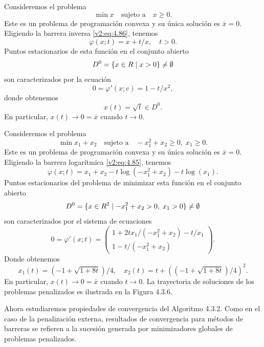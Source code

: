\begin{example}\label{v2:exa:4.3.4}
    Consideremos el problema
    \[
        \min x \quad \text{sujeto a} \quad x \ge 0.
    \]
    Este es un problema de programación convexa y su única solución es $\bar{x} = 0$.
    Eligiendo la barrera inversa \eqref{v2:eq:4.86}, tenemos
    \[
        \varphi(x; t) = x + t/x, \quad t > 0.
    \]
    Puntos estacionarios de esta función en el conjunto abierto
    \[
        D^0 = \{x \in R \mid x > 0\} \neq \emptyset
    \]
    son caracterizados por la ecuación
    \[
        0 = \varphi'(x; c) = 1 - t/x^2,
    \]
    donde obtenemos
    \[
        x(t) = \sqrt{t} \in D^0.
    \]
    En particular, $x(t) \to 0 = \bar{x}$ cuando $t \to 0$.

\end{example}

\begin{example}\label{v2:exa:4.3.5}
    Consideremos el problema
    \[
        \min x_1 + x_2 \quad \text{sujeto a} \quad -x_1^2 + x_2 \ge 0, \; x_1 \ge 0.
    \]
    Este es un problema de programación convexa y su única solución es $\bar{x} = 0$.
    Eligiendo la barrera logarítmica \eqref{v2:eq:4.85}, tenemos
    \[
        \varphi(x; t) = x_1 + x_2 - t\log(-x_1^2 + x_2) - t\log(x_1).
    \]
    Puntos estacionarios del problema de minimizar esta función en el conjunto abierto
    \[
        D^0 = \{x \in R^2 \mid -x_1^2 + x_2 > 0, \; x_1 > 0\} \neq \emptyset
    \]
    son caracterizados por el sistema de ecuaciones
    \[
        0 = \varphi'(x; t) = \begin{pmatrix} 1 + 2tx_1/(-x_1^2 + x_2) - t/x_1 \\ 1 - t/(-x_1^2 + x_2) \end{pmatrix}.
    \]
    Donde obtenemos
    \[
        x_1(t) = (-1 + \sqrt{1 + 8t})/4, \quad x_2(t) = t + ((-1 + \sqrt{1 + 8t})/4)^2.
    \]
    En particular, $x(t) \to 0 = \bar{x}$ cuando $t \to 0$.
    La trayectoria de soluciones de los problemas penalizados es ilustrada en la Figura 4.3.6.
\end{example}

Ahora estudiaremos propiedades de convergencia del Algoritmo 4.3.2. Como en el caso de la penalización externa, resultados de convergencia para métodos de barreras se refieren a la sucesión generada por minimizadores globales de problemas penalizados.


